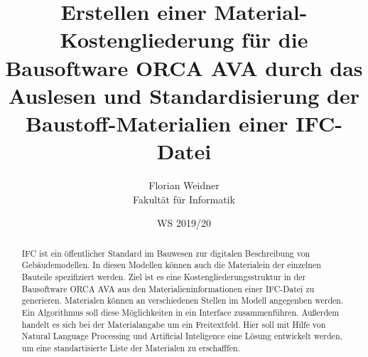 \documentclass[twoside=true, %
    DIV=15
    ,%
    BCOR=15mm, %
    headinclude=true,
    footinclude=false,
    pagesize,%
    fontsize=12pt,%
    paper=a4,%
    numbers=noenddot
  ]{scrartcl}
\begin{document}
\def\figdir{figures}
\def\tabledir{tables}

\titlehead{
\raggedleft
\texttt{[image: \\figdir/logo-th-rosenheim-2019\_master\_quer\_2c.eps]}
}

\title{
\vspace*{0cm}
Erstellen einer Material-Kostengliederung für die Bausoftware ORCA AVA durch das Auslesen und Standardisierung der Baustoff-Materialien einer IFC-Datei
}

\author{
Florian Weidner\\
Fakultät für Informatik}

\date{WS 2019/20}

\maketitle

\begin{abstract}
IFC ist ein öffentlicher Standard im Bauwesen zur digitalen Beschreibung von Gebäudemodellen. In diesen Modellen können auch die Materialein der einzelnen Bauteile spezifiziert werden. Ziel ist es eine Kostengliederungsstruktur in der Bausoftware ORCA AVA aus den Materialieninformationen einer IFC-Datei zu generieren. Materialen können an verschiedenen Stellen im Modell angegenben werden. Ein Algorithmus soll diese Möglichkeiten in ein Interface zusammenführen. Außerdem handelt es sich bei der Materialangabe um ein Freitextfeld. Hier soll mit Hilfe von Natural Language Processing und Artificial Inteligence eine Lösung entwickelt werden, um eine standartisierte Liste der Materialen zu erschafffen.
\end{abstract}
\pagebreak
\tableofcontents










\appendix





\end{document}

